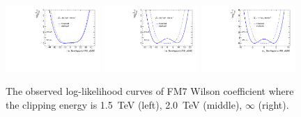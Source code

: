 \begin{figure}[ht]
    \centering
    \includegraphics[width=0.32\textwidth]{figures/aQGC/profileFM71500}
    	\includegraphics[width=0.32\textwidth]{figures/aQGC/profileFM72000}
        \includegraphics[width=0.32\textwidth]{figures/aQGC/profileFM7inf}
        \caption{The observed log-likelihood curves of FM7 Wilson coefficient where the clipping energy is 1.5~TeV (left), 2.0~TeV (middle), $\infty$ (right).}
        \label{fig:ProfileLL}
\end{figure}


